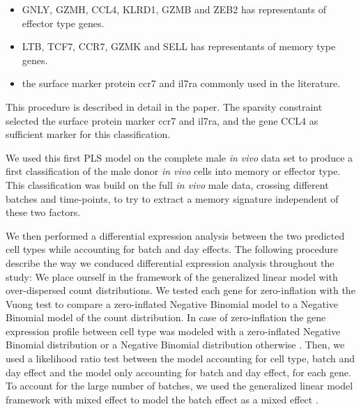 \documentclass[a4paper,12pt]{article}
\begin{document}
\begin{itemize}
  \item GNLY, GZMH, CCL4, KLRD1, GZMB and ZEB2 has representants of effector type genes.
  \item LTB, TCF7, CCR7, GZMK and SELL has representants of memory type genes.
  \item the surface marker protein ccr7 and il7ra commonly used in the literature.
\end{itemize}

This procedure is described in detail in the \citep{durifHighDimensionalClassification2018} paper.
The sparsity constraint selected the surface protein marker ccr7 and il7ra, and the gene CCL4 as sufficient marker for this classification.

We used this first PLS model on the complete male {\it in vivo} data set to produce a first classification of the male donor {\it in vivo} cells into memory or effector type.
This classification was build on the full {\it in vivo} male data, crossing different batches and time-points, to try to extract a memory signature independent of these two factors.

We then performed a differential expression analysis between the two predicted cell types while accounting for batch and day effects.
The following procedure describe the way we conduced differential expression analysis throughout the study:
We place ourself in the framework of the generalized linear model with over-dispersed count distributions.
We tested each gene for zero-inflation with the Vuong test \cite{vuongLikelihoodRatioTests1989} to compare a zero-inflated Negative Binomial model to a Negative Binomial model of the count distribution.
In case of zero-inflation the gene expression profile between cell type was modeled with a zero-inflated Negative Binomial distribution or a Negative Binomial distribution otherwise \cite{venablesModernAppliedStatistics2002, zeileisRegressionModelsCount2008}.
Then, we used a likelihood ratio test between the model accounting for cell type, batch and day effect and the model only accounting for batch and day effect, for each gene.
To account for the large number of batches, we used the generalized linear model framework with mixed effect to model the batch effect as a mixed effect \cite{fournierADModelBuilder2012, skaugGeneralizedLinearMixed2016}.
\end{document}
